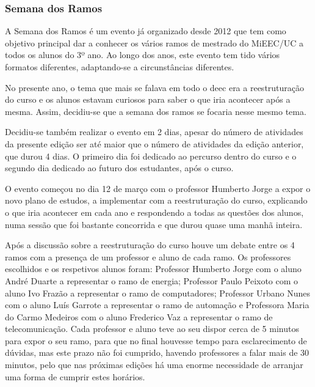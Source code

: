 
\subsubsection{Semana dos Ramos}

A Semana dos Ramos é um evento já organizado desde 2012 que tem como objetivo principal dar a conhecer os vários ramos de mestrado do MiEEC/UC a todos os alunos do 3º ano. Ao longo dos anos, este evento tem tido vários formatos diferentes, adaptando-se a circunstâncias diferentes.

No presente ano, o tema que mais se falava em todo o \acrshort{deec} era a reestruturação do curso e os alunos estavam curiosos para saber o que iria acontecer após a mesma. Assim, decidiu-se que a semana dos ramos se focaria nesse mesmo tema.

Decidiu-se também realizar o evento em 2 dias, apesar do número de atividades da presente edição ser até maior que o número de atividades da edição anterior, que durou 4 dias. O primeiro dia foi dedicado ao percurso dentro do curso e o segundo dia dedicado ao futuro dos estudantes, após o curso.

O evento começou no dia 12 de março com o professor Humberto Jorge a expor o novo plano de estudos, a implementar com a reestruturação do curso, explicando o que iria acontecer em cada ano e respondendo a todas as questões dos alunos, numa sessão que foi bastante concorrida e que durou quase uma manhã inteira. 

Após a discussão sobre a reestruturação do curso houve um debate entre os 4 ramos com a presença de um professor e aluno de cada ramo. Os professores escolhidos e os respetivos alunos foram: Professor Humberto Jorge com o aluno André Duarte a representar o ramo de energia; Professor Paulo Peixoto com o aluno Ivo Frazão a representar o ramo de computadores; Professor Urbano Nunes com o aluno Luís Garrote a representar o ramo de automação e Professora Maria do Carmo Medeiros com o aluno Frederico Vaz a representar o ramo de telecomunicação. Cada professor e aluno teve ao seu dispor cerca de 5 minutos para expor o seu ramo, para que no final houvesse tempo para esclarecimento de dúvidas, mas este prazo não foi cumprido, havendo professores a falar mais de 30 minutos, pelo que nas próximas edições há uma enorme necessidade de arranjar uma forma de cumprir estes horários.

